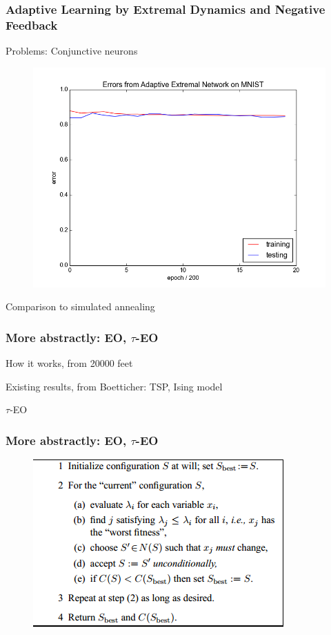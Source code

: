\documentclass{beamer}
\begin{document}
\begin{frame}
  \frametitle{Adaptive Learning by Extremal Dynamics and Negative Feedback}
  Problems: Conjunctive neurons
  \begin{figure}
    \includegraphics{bak_plot}
  \end{figure}

  Comparison to simulated annealing
\end{frame}

\begin{frame}
  \frametitle{More abstractly: EO, $\tau$-EO}
  How it works, from 20000 feet

  Existing results, from Boetticher: TSP, Ising model

  $\tau$-EO
\end{frame}

\begin{frame}
  \frametitle{More abstractly: EO, $\tau$-EO}
  \begin{figure}
    \includegraphics{eo_alg}
  \end{figure}
\end{frame}
\end{document}
